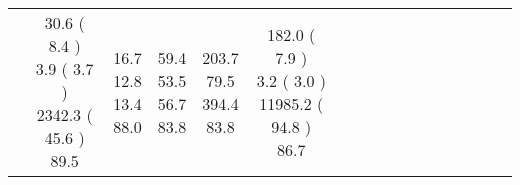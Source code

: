 \documentclass[9pt]{article}
\begin{document}
\begin{landscape}
\begin{longtable}{ l | c c c c | c c c c | c c c c | c c c c |}
 &
                    
                            \makecell{              30.6
     (             8.4
    ) \\
            {\footnotesize             3.9
     (              3.7
     )} \\
            {\footnotesize             2342.3
     (            45.6
    ) } \\
            {\small  \textcolor[rgb]{ 0.41 , 0.491 , 0.1} {89.5  }
} }


             &
                            \makecell{              16.7
     \\
            {\footnotesize             12.8
    } \\  {\footnotesize             13.4
     } \\
            {\small \textcolor[rgb]{ 0.44 , 0.461 , 0.1} {88.0  }
} }
             &                         \makecell{              59.4
     \\
            {\footnotesize             53.5
    } \\  {\footnotesize             56.7
     } \\
            {\small \textcolor[rgb]{ 0.524 , 0.377 , 0.1} {83.8  }
} }
             &
                            \makecell{              203.7
     \\
            {\footnotesize             79.5
    } \\  {\footnotesize             394.4
     } \\
            {\small \textcolor[rgb]{ 0.524 , 0.377 , 0.1} {83.8  }
} }
            

 & 
                            \makecell{              182.0
     (             7.9
    ) \\
            {\footnotesize             3.2
     (              3.0
     )} \\
            {\footnotesize             11985.2
     (            94.8
    ) } \\
            {\small  \textcolor[rgb]{ 0.466 , 0.435 , 0.1} {86.7  }
} }



\end{longtable}
\end{landscape}
\end{document}
